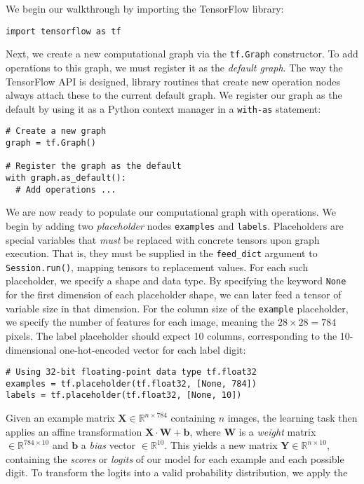 We begin our walkthrough by importing the TensorFlow library:
%
\begin{lstlisting}
import tensorflow as tf
\end{lstlisting}
%
Next, we create a new computational graph via the \texttt{tf.Graph}
constructor. To add operations to this graph, we must register it as the
\emph{default graph}. The way the TensorFlow API is designed, library routines
that create new operation nodes always attach these to the current default
graph. We register our graph as the default by using it as a Python context
manager in a \texttt{with-as} statement:
%
\begin{lstlisting}
# Create a new graph
graph = tf.Graph()

# Register the graph as the default
with graph.as_default():
  # Add operations ...
\end{lstlisting}
%
We are now ready to populate our computational graph with operations. We begin
by adding two \emph{placeholder} nodes \texttt{examples} and
\texttt{labels}. Placeholders are special variables that \emph{must} be replaced
with concrete tensors upon graph execution. That is, they must be supplied in
the \texttt{feed\_dict} argument to \texttt{Session.run()}, mapping tensors to
replacement values. For each such placeholder, we specify a shape and data
type. By specifying the keyword \texttt{None} for the first dimension of each
placeholder shape, we can later feed a tensor of variable size in that
dimension. For the column size of the \texttt{example} placeholder, we specify
the number of features for each image, meaning the $28 \times 28 = 784$
pixels. The label placeholder should expect 10 columns, corresponding to the
10-dimensional one-hot-encoded vector for each label digit:
%
\begin{lstlisting}
# Using 32-bit floating-point data type tf.float32
examples = tf.placeholder(tf.float32, [None, 784])
labels = tf.placeholder(tf.float32, [None, 10])
\end{lstlisting}
%
Given an example matrix $\mathbf{X} \in \mathbb{R}^{n \times 784}$ containing
$n$ images, the learning task then applies an affine transformation
$\mathbf{X} \cdot \mathbf{W} + \mathbf{b}$, where $\mathbf{W}$ is a
\emph{weight} matrix $\in \mathbb{R}^{784 \times 10}$ and $\mathbf{b}$ a
\emph{bias} vector $\in \mathbb{R}^{10}$. This yields a new matrix
$\mathbf{Y} \in \mathbb{R}^{n \times 10}$, containing the \emph{scores} or
\emph{logits} of our model for each example and each possible digit. To
transform the logits into a valid probability distribution, we apply the
